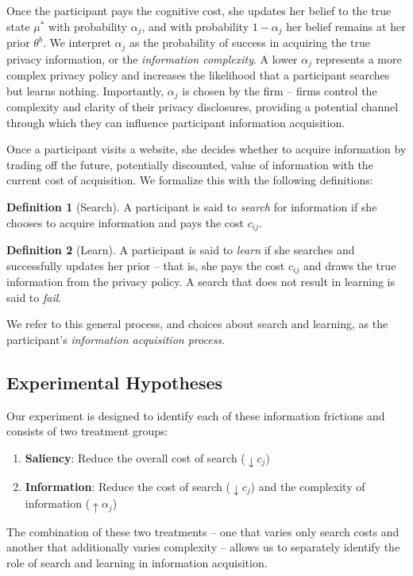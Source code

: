 \documentclass[12pt]{article}
\theoremstyle{definition}
\newtheorem{definition}{Definition}[section]
\theoremstyle{remark}
\begin{document}
Once the participant pays the cognitive cost, she updates her belief to the true state $\mu^*$ with probability $\alpha_j$, and with probability $1 - \alpha_j$ her belief remains at her prior $\theta^b$. We interpret $\alpha_j$ as the probability of success in acquiring the true privacy information, or the \emph{information complexity}. A lower $\alpha_j$ represents a more complex privacy policy and increases the likelihood that a participant searches but learns nothing. Importantly, $\alpha_j$ is chosen by the firm -- firms control the complexity and clarity of their privacy disclosures, providing a potential channel through which they can influence participant information acquisition.

Once a participant visits a website, she decides whether to acquire information by trading off the future, potentially discounted, value of information with the current cost of acquisition. We formalize this with the following definitions:

\begin{definition}[Search]
A participant is said to \emph{search} for information if she chooses to acquire information and pays the cost $c_{ij}$.
\end{definition}
 
\begin{definition}[Learn]
A participant is said to \emph{learn} if she searches and successfully updates her prior -- that is, she pays the cost $c_{ij}$ and draws the true information from the privacy policy. A search that does not result in learning is said to \emph{fail}.
\end{definition}

\noindent We refer to this general process, and choices about search and learning, as the participant's \emph{information acquisition process}.

\subsection{Experimental Hypotheses}

Our experiment is designed to identify each of these information frictions and consists of two treatment groups: 
\begin{enumerate}
    \item \textbf{Saliency}: Reduce the overall cost of search ($ \downarrow c_{j}$)
    \item \textbf{Information}: Reduce the cost of search ($\downarrow c_{j}$) and the complexity of information ($ \uparrow \alpha_{j}$)
\end{enumerate}
The combination of these two treatments -- one that varies only search costs and another that additionally varies complexity -- allows us to separately identify the role of search and learning in information acquisition. 
\end{document}
